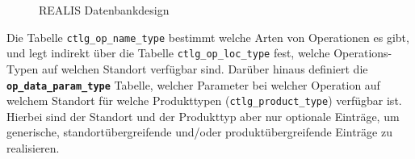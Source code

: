\begin{figure}[!htbp]
    \centering
    \caption{REALIS Datenbankdesign}
    \label{fig:realis-datenbankdesign}
\end{figure}

Die Tabelle \texttt{ctlg\_op\_name\_type} bestimmt welche Arten von Operationen es gibt, und legt indirekt über die Tabelle \texttt{ctlg\_op\_loc\_type} fest, welche Operations-Typen auf welchen Standort verfügbar sind. Darüber hinaus definiert die 
\textbf{\texttt{op\_data\_param\_\-type}} Tabelle, welcher Parameter bei welcher Operation auf welchem Standort für welche Produkttypen (\texttt{ctlg\_product\_type}) verfügbar ist. Hierbei sind der Standort und der Produkttyp aber nur optionale Einträge, um generische, standortübergreifende und/oder produktübergreifende Einträge zu realisieren.

